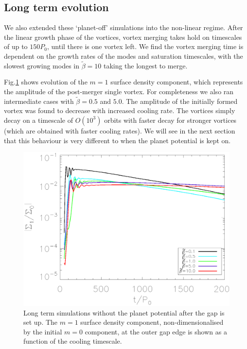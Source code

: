 \subsection{Long term evolution} \label{nonlinearplanetoff} 

We also extended these `planet-off' simulations into the non-linear
regime. After the linear growth phase of the vortices, vortex merging
takes hold on timescales of up to $150P_0$, until there is one vortex
left. We find the vortex merging
time is dependent on the growth rates of the modes and saturation
timescales, with the slowest growing modes in $\tilde\beta=10$ taking
the longest to merge.  

Fig.\ref{planetofflifetimeplot} shows evolution of the $m=1$ surface
density component, which represents the amplitude of the post-merger
single vortex. For completeness we also ran intermediate cases with
$\tilde{\beta}=0.5$ and $5.0$. The amplitude of the initially formed vortex was 
found to decrease with increased cooling rate. The vortices simply decay on a
timescale of $O(10^3)$ orbits with faster decay for stronger vortices
(which are obtained with faster cooling rates). We will see in the
next section that this behaviour is very different to when the planet
potential is kept on. 



\begin{figure}
  \includegraphics[width=\linewidth,clip=true,trim=0.5cm
  0cm 0cm 1.1cm]{figures/longterm_planetoff}
  \caption{Long term simulations without the planet potential after
    the gap is set up. The $m=1$ surface density component,
    non-dimensionalised by the initial $m=0$ component, at the
    outer gap edge is shown as a function of the cooling timescale. 
  } \label{planetofflifetimeplot}
\end{figure}

